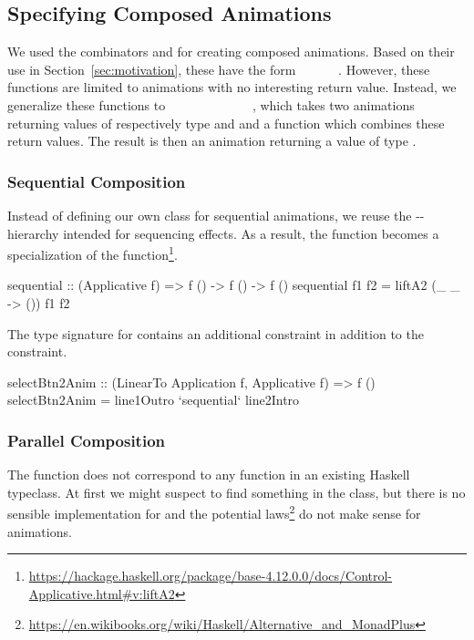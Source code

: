 \subsection{Specifying Composed Animations}

We used the combinators  and  for creating composed animations. Based on their use in Section~\ref{sec:motivation}, these have the form ~\hs{()}~\hs{->}~~\hs{->}~~\hs{()}. However, these functions are limited to animations with no interesting return value. Instead, we generalize these functions to \hs{(}~\hs{->}~~\hs{->}~\hs{)}~\hs{->}~~~\hs{->}~~~\hs{->}~~, which takes two animations returning values of respectively type  and  and a function which combines these return values. The result is then an animation returning a value of type .

\subsubsection{Sequential Composition}

Instead of defining our own class for sequential animations, we reuse the -- hierarchy intended for sequencing effects. As a result, the  function becomes a specialization of the  function\footnote{\url{https://hackage.haskell.org/package/base-4.12.0.0/docs/Control-Applicative.html#v:liftA2}}.

\begin{code}
sequential :: (Applicative f) => f () -> f () -> f ()
sequential f1 f2 = liftA2 (\_ _ -> ()) f1 f2
\end{code}

The type signature for  contains an additional  constraint in addition to the  constraint.

\begin{code}
selectBtn2Anim :: (LinearTo Application f, Applicative f) => f ()
selectBtn2Anim = line1Outro `sequential` line2Intro
\end{code}

\subsubsection{Parallel Composition}

The  function does not correspond to any function in an existing Haskell typeclass. At first we might suspect to find something in the  class, but there is no sensible implementation for  and the potential laws\footnote{\url{https://en.wikibooks.org/wiki/Haskell/Alternative_and_MonadPlus}} do not make sense for animations.

